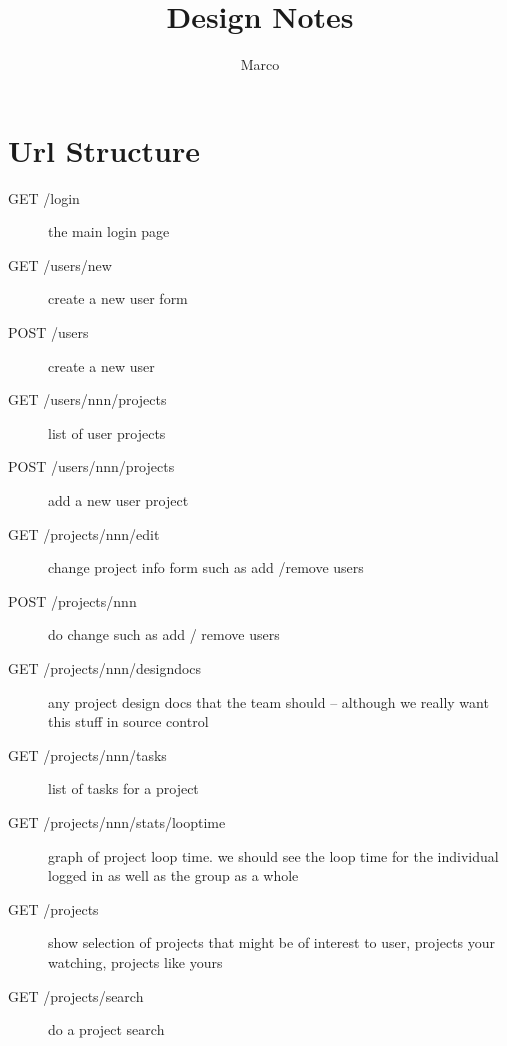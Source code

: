 \documentclass{article}
\title{Design Notes}
\author{Marco}
\begin{document}
\maketitle
\tableofcontents
\section{Url Structure}
\begin{description}
\item[GET /login] the main login page
\item[GET /users/new] create a new user form
\item[POST /users] create a new user
\item[GET /users/nnn/projects] list of user projects
\item[POST /users/nnn/projects] add a new user project
\item[GET /projects/nnn/edit] change project info form such as add /remove users
\item[POST /projects/nnn] do change such as add / remove users
\item[GET /projects/nnn/designdocs] any project design docs that the team should -- although we
really want this stuff in source control
\item[GET /projects/nnn/tasks] list of tasks for a project
\item[GET /projects/nnn/stats/looptime] graph of project loop time. we should see the loop time for the individual logged in as well as the group as a whole
\item[GET /projects] show selection of projects that might be of interest to user, projects your watching,
projects like yours
\item[GET /projects/search] do a project search
\end{description}
\end{document}
